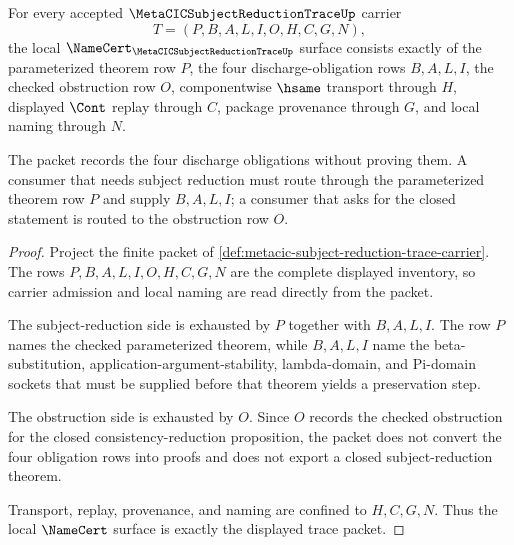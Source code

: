 \begin{theorem}
\label{thm:metacic-subject-reduction-trace-namecert-obligations}
For every accepted $\MetaCICSubjectReductionTraceUp$ carrier
$$
T=(P,B,A,L,I,O,H,C,G,N),
$$
the local $\NameCert_{\MetaCICSubjectReductionTraceUp}$ surface consists exactly of the parameterized theorem row $P$, the four discharge-obligation rows $B,A,L,I$, the checked obstruction row $O$, componentwise $\hsame$ transport through $H$, displayed $\Cont$ replay through $C$, package provenance through $G$, and local naming through $N$.

The packet records the four discharge obligations without proving them. A consumer that needs subject reduction must route through the parameterized theorem row $P$ and supply $B,A,L,I$; a consumer that asks for the closed statement is routed to the obstruction row $O$.
\end{theorem}
\begin{proof}
Project the finite packet of \autoref{def:metacic-subject-reduction-trace-carrier}. The rows $P,B,A,L,I,O,H,C,G,N$ are the complete displayed inventory, so carrier admission and local naming are read directly from the packet.

The subject-reduction side is exhausted by $P$ together with $B,A,L,I$. The row $P$ names the checked parameterized theorem, while $B,A,L,I$ name the beta-substitution, application-argument-stability, lambda-domain, and Pi-domain sockets that must be supplied before that theorem yields a preservation step.

The obstruction side is exhausted by $O$. Since $O$ records the checked obstruction for the closed consistency-reduction proposition, the packet does not convert the four obligation rows into proofs and does not export a closed subject-reduction theorem.

Transport, replay, provenance, and naming are confined to $H,C,G,N$. Thus the local $\NameCert$ surface is exactly the displayed trace packet.
\end{proof}

